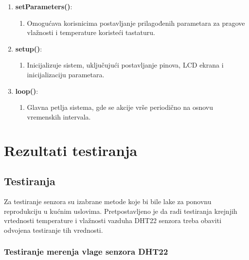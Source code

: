 \documentclass[a4paper, 12pt]{article}
\begin{document}
\begin{enumerate}[label=\arabic*.,leftmargin=*]
    \item \textbf{setParameters()}:
        \begin{enumerate}[label={},leftmargin=*] 
            \item Omogućava korisnicima postavljanje prilagođenih parametara za pragove vlažnosti i temperature koristeći tastaturu.
        \end{enumerate}
        
    \item \textbf{setup()}:
        \begin{enumerate}[label={},leftmargin=*]
        		\sloppypar
            \item Inicijalizuje sistem, uključujući postavljanje pinova, LCD ekrana i inicijalizaciju parametara.
        \end{enumerate}
        
    \item \textbf{loop()}:
        \begin{enumerate}[label={},leftmargin=*] 
            \item Glavna petlja sistema, gde se akcije vrše periodično na osnovu vremenskih intervala.
        \end{enumerate}
\end{enumerate}

\pagebreak
\endgroup

\begingroup
\justifying
\section{Rezultati testiranja}

\vspace{10pt}

	\subsection{Testiranja}
	
\vspace{10pt}

Za testiranje senzora su izabrane metode koje bi bile lake za ponovnu reprodukciju u kućnim uslovima. Pretpostavljeno je da radi testiranja krejnjih vrtednosti temperature i vlažnosti vazduha DHT22 senzora treba obaviti odvojena testiranje tih vrednosti. 

		\subsubsection*{Testiranje merenja vlage senzora DHT22}
\end{document}
